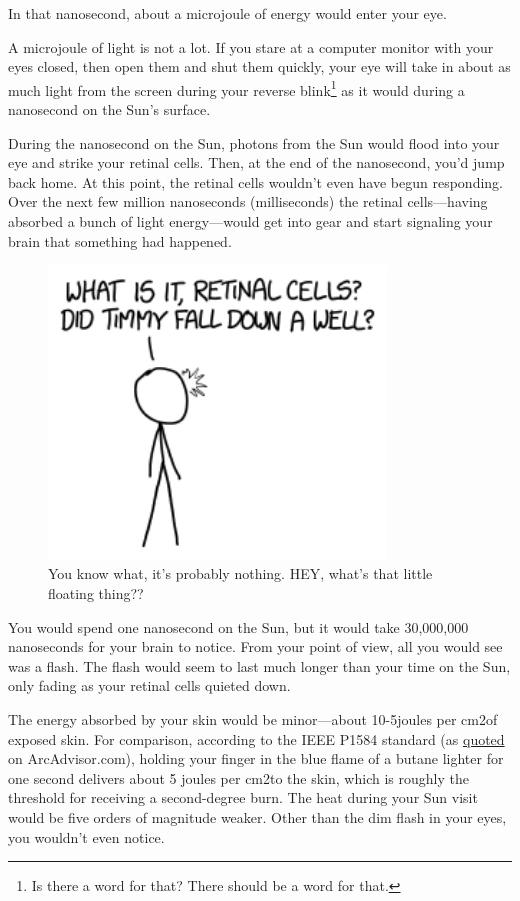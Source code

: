 {{In that nanosecond, about a microjoule of energy would enter your eye.}

{A microjoule of light is not a lot. If you stare at a computer monitor with your eyes closed, then open them and shut them quickly, your eye will take in about as much light from the screen during your reverse blink{\footnote{Is there a word for that? There should be a word for that.} } as it would during a nanosecond on the Sun's surface.}

{During the nanosecond on the Sun, photons from the Sun would flood into your eye and strike your retinal cells. Then, at the end of the nanosecond, you'd jump back home. At this point, the retinal cells wouldn't even have begun responding. Over the next few million nanoseconds (milliseconds) the retinal cells—having absorbed a bunch of light energy—would get into gear and start signaling your brain that something had happened.}

\begin{figure}[!htbp]
\centering
\includegraphics[scale=0.5, max width=0.8\textwidth]{imgs/a/115/cells.png}
\caption{You know what, it's probably nothing. HEY, what's that little floating thing??}
\end{figure}

{You would spend one nanosecond on the Sun, but it would take 30,000,000 nanoseconds for your brain to notice. From your point of view, all you would see was a flash. The flash would seem to last much longer than your time on the Sun, only fading as your retinal cells quieted down.}

{The energy absorbed by your skin would be minor—about 10-5joules per cm2of exposed skin. For comparison, according to the IEEE P1584 standard (as \href{http://www.arcadvisor.com/faq/threshold-incident-energy-second-degree-burn.html}{quoted} on ArcAdvisor.com), holding your finger in the blue flame of a butane lighter for one second delivers about 5 joules per cm2to the skin, which is roughly the threshold for receiving a second-degree burn. The heat during your Sun visit would be five orders of magnitude weaker. Other than the dim flash in your eyes, you wouldn't even notice.}

}
